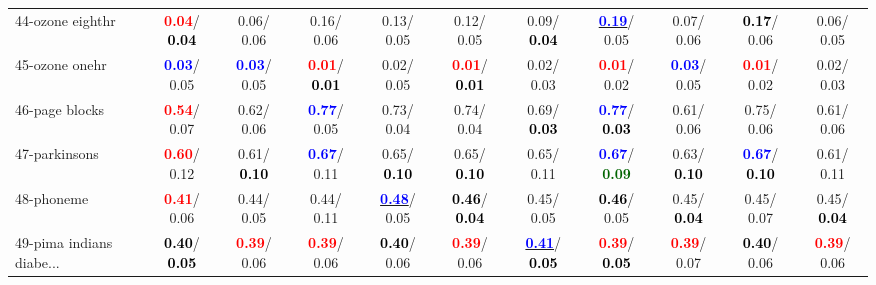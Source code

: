\begin{table}[h]
\begin{center}
{\begin{tabular}{lc|c|c|c|c|c|c|c|c|c}
44-ozone eighthr & \textcolor{red}{\textbf{  0.04}}/\textcolor{black}{\textbf{  0.04}} &   0.06/  0.06 &   0.16/  0.06 &   0.13/  0.05 &   0.12/  0.05 &   0.09/\textcolor{black}{\textbf{  0.04}} & \underline{\textcolor{blue}{\textbf{  0.19}}}/  0.05 &   0.07/  0.06 & \textcolor{black}{\textbf{  0.17}}/  0.06 &   0.06/  0.05 \\
45-ozone onehr & \textcolor{blue}{\textbf{  0.03}}/  0.05 & \textcolor{blue}{\textbf{  0.03}}/  0.05 & \textcolor{red}{\textbf{  0.01}}/\textcolor{black}{\textbf{  0.01}} &   0.02/  0.05 & \textcolor{red}{\textbf{  0.01}}/\textcolor{black}{\textbf{  0.01}} &   0.02/  0.03 & \textcolor{red}{\textbf{  0.01}}/  0.02 & \textcolor{blue}{\textbf{  0.03}}/  0.05 & \textcolor{red}{\textbf{  0.01}}/  0.02 &   0.02/  0.03 \\
46-page blocks & \textcolor{red}{\textbf{  0.54}}/  0.07 &   0.62/  0.06 & \textcolor{blue}{\textbf{  0.77}}/  0.05 &   0.73/  0.04 &   0.74/  0.04 &   0.69/\textcolor{black}{\textbf{  0.03}} & \textcolor{blue}{\textbf{  0.77}}/\textcolor{black}{\textbf{  0.03}} &   0.61/  0.06 &   0.75/  0.06 &   0.61/  0.06 \\ \hline
47-parkinsons & \textcolor{red}{\textbf{  0.60}}/  0.12 &   0.61/\textcolor{black}{\textbf{  0.10}} & \textcolor{blue}{\textbf{  0.67}}/  0.11 &   0.65/\textcolor{black}{\textbf{  0.10}} &   0.65/\textcolor{black}{\textbf{  0.10}} &   0.65/  0.11 & \textcolor{blue}{\textbf{  0.67}}/\textcolor{darkgreen}{\textbf{  0.09}} &   0.63/\textcolor{black}{\textbf{  0.10}} & \textcolor{blue}{\textbf{  0.67}}/\textcolor{black}{\textbf{  0.10}} &   0.61/  0.11 \\
48-phoneme & \textcolor{red}{\textbf{  0.41}}/  0.06 &   0.44/  0.05 &   0.44/  0.11 & \underline{\textcolor{blue}{\textbf{  0.48}}}/  0.05 & \textcolor{black}{\textbf{  0.46}}/\textcolor{black}{\textbf{  0.04}} &   0.45/  0.05 & \textcolor{black}{\textbf{  0.46}}/  0.05 &   0.45/\textcolor{black}{\textbf{  0.04}} &   0.45/  0.07 &   0.45/\textcolor{black}{\textbf{  0.04}} \\
49-pima indians diabe... & \textcolor{black}{\textbf{  0.40}}/\textcolor{black}{\textbf{  0.05}} & \textcolor{red}{\textbf{  0.39}}/  0.06 & \textcolor{red}{\textbf{  0.39}}/  0.06 & \textcolor{black}{\textbf{  0.40}}/  0.06 & \textcolor{red}{\textbf{  0.39}}/  0.06 & \underline{\textcolor{blue}{\textbf{  0.41}}}/\textcolor{black}{\textbf{  0.05}} & \textcolor{red}{\textbf{  0.39}}/\textcolor{black}{\textbf{  0.05}} & \textcolor{red}{\textbf{  0.39}}/  0.07 & \textcolor{black}{\textbf{  0.40}}/  0.06 & \textcolor{red}{\textbf{  0.39}}/  0.06 \\

\end{tabular}}
\end{center}
\end{table}
